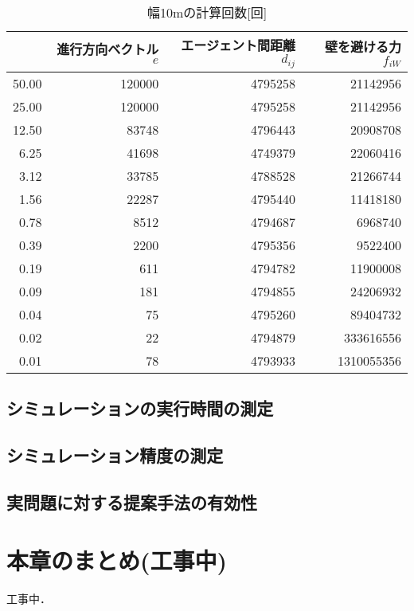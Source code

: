 \begin{table}[t]
  \centering
  \caption{幅10mの計算回数[回]}
  \label{tb:haba10_times}
  \begin{tabular}{r|r|r|r}
  \hline \hline
          & 進行方向ベクトル$e$ & エージェント間距離$d_{ij}$ & 壁を避ける力$f_{iW}$ \\ \hline
    50.00 & 120000 & 4795258 & 21142956 \\ \hline
    25.00 & 120000 & 4795258 & 21142956 \\ \hline
    12.50 & 83748 & 4796443 & 20908708 \\ \hline
    6.25 & 41698 & 4749379 & 22060416 \\ \hline
    3.12 & 33785 & 4788528 & 21266744 \\ \hline
    1.56 & 22287 & 4795440 & 11418180 \\ \hline
    0.78 & 8512 & 4794687 & 6968740 \\ \hline
    0.39 & 2200 & 4795356 & 9522400 \\ \hline
    0.19 & 611 & 4794782 & 11900008 \\ \hline
    0.09 & 181 & 4794855 & 24206932 \\ \hline
    0.04 & 75 & 4795260 & 89404732 \\ \hline
    0.02 & 22 & 4794879 & 333616556 \\ \hline
    0.01 & 78 & 4793933 & 1310055356 \\ \hline
  \end{tabular}
\end{table}


\clearpage
\subsection{シミュレーションの実行時間の測定}

\subsection{シミュレーション精度の測定}

\subsection{実問題に対する提案手法の有効性}

\section{本章のまとめ(工事中)}
工事中．

